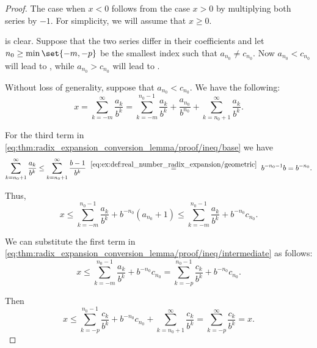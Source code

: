 \begin{proof}
  The case when \( x < 0 \) follows from the case \( x > 0 \) by multiplying both series by \( -1 \). For simplicity, we will assume that \( x \geq 0 \).

   is clear. Suppose that the two series differ in their coefficients and let \( n_0 \geq \min\set{ -m, -p } \) be the smallest index such that \( a_{n_0} \neq c_{n_0} \). Now \( a_{n_0} < c_{n_0} \) will lead to , while \( a_{n_0} > c_{n_0} \) will lead to .

  Without loss of generality, suppose that \( a_{n_0} < c_{n_0} \). We have the following:
  \begin{equation}\label{eq:thm:radix_expansion_conversion_lemma/proof/ineq/base}
    x
    =
    \sum_{k=-m}^\infty \frac {a_k} {b^k}
    =
    \sum_{k=-m}^{n_0 - 1} \frac {a_k} {b^k} + \frac {a_{n_0}} {b^{n_0}} + \sum_{k=n_0+1}^\infty \frac {a_k} {b^k}.
  \end{equation}

  For the third term in \eqref{eq:thm:radix_expansion_conversion_lemma/proof/ineq/base} we have
  \begin{equation}\label{eq:thm:radix_expansion_conversion_lemma/proof/third_term}
    \sum_{k=n_0+1}^\infty \frac {a_k} {b^k}
    \leq
    \sum_{k=n_0+1}^\infty \frac {b - 1} {b^k}
    \reloset {\eqref{eq:ex:def:real_number_radix_expansion/geometric}} =
    b^{-n_0-1} b
    =
    b^{-n_0}.
  \end{equation}

  Thus,
  \begin{equation}\label{eq:thm:radix_expansion_conversion_lemma/proof/ineq/intermediate}
    x
    \leq
    \sum_{k=-m}^{n_0 - 1} \frac {a_k} {b^k} + b^{-n_0} (a_{n_0} + 1)
    \leq
    \sum_{k=-m}^{n_0 - 1} \frac {a_k} {b^k} + b^{-n_0} c_{n_0}.
  \end{equation}

  We can substitute the first term in \eqref{eq:thm:radix_expansion_conversion_lemma/proof/ineq/intermediate} as follows:
  \begin{equation*}
    x
    \leq
    \sum_{k=-m}^{n_0 - 1} \frac {a_k} {b^k} + b^{-n_0} c_{n_0}
    =
    \sum_{k=-p}^{n_0 - 1} \frac {c_k} {b^k} + b^{-n_0} c_{n_0}.
  \end{equation*}

  Then
  \begin{equation}\label{eq:thm:radix_expansion_conversion_lemma/proof/ineq/final}
    x
    \leq
    \sum_{k=-p}^{n_0 - 1} \frac {c_k} {b^k} + b^{-n_0} c_{n_0} + \sum_{k=n_0+1}^\infty \frac {c_k} {b^k}
    =
    \sum_{k=-p}^\infty \frac {c_k} {b^k}
    =
    x.
  \end{equation}


\end{proof}
